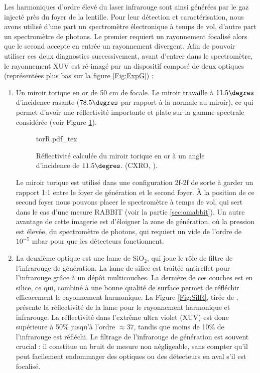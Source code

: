 Les harmoniques d'ordre élevé du laser infrarouge sont ainsi générées par le gaz injecté près du foyer de la lentille. Pour leur détection et caractérisation, nous avons utilisé d'une part un spectromètre électronique à temps de vol, d'autre part un spectromètre de photons. Le premier requiert un rayonnement focalisé alors que le second accepte en entrée un rayonnement divergent. Afin de pouvoir utiliser ces deux diagnostics successivement, avant d'entrer dans le spectromètre, le rayonnement XUV est ré-imagé par un dispositif composé de deux optiques (représentées plus bas sur la figure \ref{Fig:ExpG}) :
\begin{enumerate}
\item Un miroir torique en or de 50 cm de focale. Le miroir travaille à $11.5\degres$ d'incidence rasante ($78.5\degres$ par rapport à la normale au miroir), ce qui permet d'avoir une réflectivité importante et plate sur la gamme spectrale considérée (voir Figure \ref{Fig:TorR}).

\begin{figure}[!ht]
\centering
\def\svgwidth{0.6\columnwidth}
{torR.pdf_tex}
\caption{Réflectivité calculée du miroir torique en or à un angle d'incidence de $11.5\degres$. (CXRO, ).}
\label{Fig:TorR}
\end{figure}
Le miroir torique est utilisé dans une configuration 2f-2f de sorte à garder un rapport\shorthandoff{:} 1:1 \shorthandon{:}entre le foyer de génération et le second foyer. \`{A} la position de ce second foyer nous pouvons placer le spectromètre à temps de vol, qui sert dans le cas d'une mesure RABBIT (voir la partie \ref{sec:omabbit}). Un autre avantage de cette imagerie est d'éloigner la zone de génération, où la pression est élevée, du spectromètre de photons, qui requiert un vide de l'ordre de $10^{-5}$ mbar pour que les détecteurs fonctionnent.\\

\item La deuxième optique est une lame de Si$\mbox{O}_{\mbox{2}}$, qui joue le rôle de filtre de l'infrarouge de génération. La lame de silice est traitée antireflet pour l'infrarouge grâce à un dépôt multicouches. La dernière de ces couches est en silice, ce qui, combiné à une bonne qualité de surface permet de réfléchir efficacement le rayonnement harmonique. La Figure \ref{Fig:SilR}, tirée de , présente la réflectivité de la lame pour le rayonnement harmonique et infrarouge. La réflectivité dans l'extrême ultra violet (XUV) est donc supérieure à 50\% jusqu'à l'ordre $\approx 37$, tandis que moins de 10\% de l'infrarouge est réfléchi. Le filtrage de l'infrarouge de génération est souvent crucial : il constitue un bruit de mesure non négligeable, sans compter qu'il peut facilement endommager des optiques ou des détecteurs en aval s'il est focalisé.


\end{enumerate}
